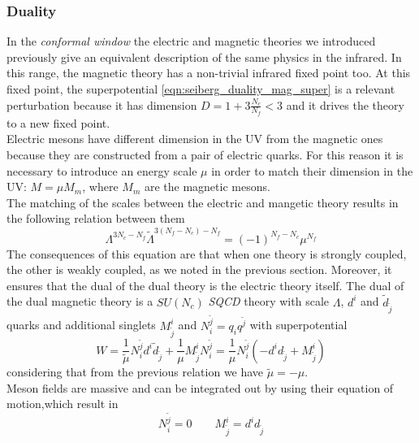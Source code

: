 \subsubsection{Duality}
In the \emph{conformal window} the electric and magnetic theories we introduced previously give an equivalent description of the same physics in the infrared.
In this range, the magnetic theory has a non-trivial infrared fixed point too. 
At this fixed point, the superpotential \eqref{eqn:seiberg_duality_mag_super} is a relevant perturbation because it has dimension $D = 1 + 3 \frac{N_c}{N_f}  <3 $ and it drives the theory to a new fixed point.\\
Electric mesons have different dimension in the UV from the magnetic ones because they are constructed from a pair of electric quarks.
For this reason it is necessary to introduce an energy scale $\mu$ in order to match their dimension in the UV: $ M = \mu M_m$, where $M_m$ are the magnetic mesons.\\
The matching of the scales between the electric and mangetic theory results in the following relation between them \cite{Seiberg:1994pq}
\begin{equation}
 \Lambda^{3 N_c - N_f} \tilde{\Lambda}^{3 (N_f - N_c) - N_f} = (-1)^{N_f - N_c} \mu^{N_f}
 \label{eqn:seib_dual_matching_scales}
\end{equation}
The consequences of this equation are that when one theory is strongly coupled, the other is weakly coupled, as we noted in the previous section.
Moreover, it ensures that the dual of the dual theory is the electric theory itself.
The dual of the dual magnetic theory is a $SU(N_c) $ \emph{SQCD} theory with scale $\Lambda$, $d^i$ and $\tilde{d}_{\tilde{j}}$ quarks and additional singlets $M^i_{\tilde{j}}$ and $N^{\tilde{j}}_i= q_i q^{\tilde{j}} $ with superpotential
\begin{equation}
 W = \frac{1}{\tilde{\mu}} N^{\tilde{j}}_i d^i \tilde{d}_{\tilde{j}} + \frac{1}{\mu} M^i_{\tilde{j}} N^{\tilde{j}}_i = \frac{1}{\mu} N^{\tilde{j}}_i \left(  - d^i d_{\tilde{j}}  + M^i_{\tilde{j}}  \right) 
\end{equation}
considering that from the previous relation we have $\tilde{\mu} = - \mu$.\\
Meson fields are massive and can be integrated out by using their equation of motion,which result in
\begin{equation}
 N^{\tilde{j}}_i  = 0 \qquad  M^i_{\tilde{j}} = d^i d_{\tilde{j}}
\end{equation}
